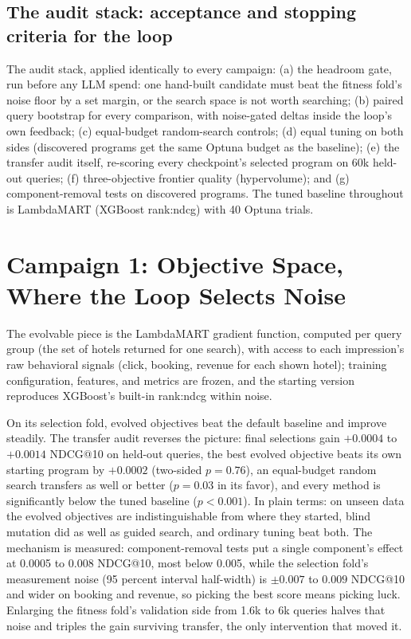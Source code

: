 \documentclass[]{ceurart}
\begin{document}
\subsection{The audit stack: acceptance and stopping criteria for the loop}
\label{sec:audit}
The audit stack, applied identically to every campaign: (a) the headroom
gate, run before any LLM spend: one hand-built candidate must beat the
fitness fold's noise floor by a set margin, or the search space is not
worth searching; (b) paired query
bootstrap for every comparison, with noise-gated deltas inside the loop's
own feedback; (c) equal-budget random-search controls; (d) equal tuning on both sides (discovered programs get the same Optuna
budget as the baseline); (e) the transfer audit itself, re-scoring every
checkpoint's selected program on 60k held-out queries; (f) three-objective
frontier quality (hypervolume); and (g) component-removal tests on
discovered programs. The tuned baseline throughout is LambdaMART (XGBoost
rank:ndcg) with 40 Optuna trials.

\section{Campaign 1: Objective Space, Where the Loop Selects Noise}
The evolvable piece is the LambdaMART gradient function, computed per
query group (the set of hotels returned for one search), with access to each impression's raw behavioral signals (click, booking,
revenue for each shown hotel); training configuration, features, and
metrics are frozen, and the starting version reproduces XGBoost's built-in
rank:ndcg within noise.

On its selection fold, evolved objectives beat the default baseline and
improve steadily. The transfer audit reverses the picture: final selections gain $+0.0004$
to $+0.0014$ NDCG@10 on held-out queries, the best evolved objective beats
its own starting program by $+0.0002$ (two-sided $p=0.76$), an equal-budget random
search transfers as well or better ($p=0.03$ in its favor), and every method
is significantly below the tuned baseline ($p<0.001$). In plain terms: on
unseen data the evolved objectives are indistinguishable from where they
started, blind mutation did as well as guided search, and ordinary tuning
beat both. The mechanism is measured: component-removal tests put a single
component's effect at 0.0005 to 0.008 NDCG@10, most below 0.005, while the
selection fold's measurement noise (95 percent interval half-width) is
$\pm 0.007$ to $0.009$ NDCG@10 and wider on booking and revenue, so
picking the best score means picking luck. Enlarging the fitness fold's validation side from 1.6k to 6k queries
halves that noise and triples the gain surviving transfer, the only
intervention that moved it.
\end{document}
